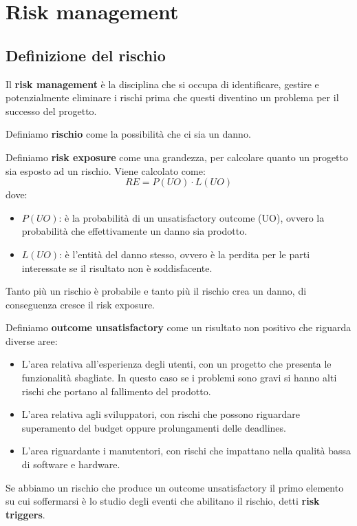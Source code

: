 \chapter{Risk management}
\section{Definizione del rischio}
\begin{definizione}
    Il \textbf{risk management} è la disciplina che si occupa di identificare,
    gestire e potenzialmente eliminare i rischi prima che questi diventino un
    problema per il successo del progetto.
\end{definizione}
\begin{definizione}
    Definiamo \textbf{rischio} come la possibilità che ci sia un danno.
\end{definizione}
\begin{definizione}
    Definiamo \textbf{risk exposure} come una grandezza, per calcolare quanto
    un progetto sia esposto ad un rischio. Viene calcolato come:
    \begin{equation}
        RE = P(UO) \cdot L(UO)
    \end{equation}
    dove:
    \begin{itemize}
        \item $P(UO)$: è la probabilità di un unsatisfactory outcome (UO), ovvero
              la probabilità che effettivamente un danno sia prodotto.
        \item $L(UO)$: è l'entità del danno stesso, ovvero è la perdita per le
              parti interessate se il risultato non è soddisfacente.
    \end{itemize}
    Tanto più un rischio è probabile e tanto più il rischio crea un danno, di
    conseguenza cresce il risk exposure.
\end{definizione}
\begin{definizione}
    Definiamo \textbf{outcome unsatisfactory} come un risultato non positivo che
    riguarda diverse aree:
    \begin{itemize}
        \item L'area relativa all'esperienza degli utenti, con un progetto che
              presenta le funzionalità sbagliate. In questo caso se i problemi sono
              gravi si hanno alti rischi che portano al fallimento del prodotto.
        \item L'area relativa agli sviluppatori, con rischi che possono riguardare
              superamento del budget oppure prolungamenti delle deadlines.
        \item L'area riguardante i manutentori, con rischi che impattano nella
              qualità bassa di software e hardware.
    \end{itemize}
\end{definizione}
Se abbiamo un rischio che produce un outcome unsatisfactory il primo elemento su
cui soffermarsi è lo studio degli eventi che abilitano il rischio, detti
\textbf{risk triggers}.

